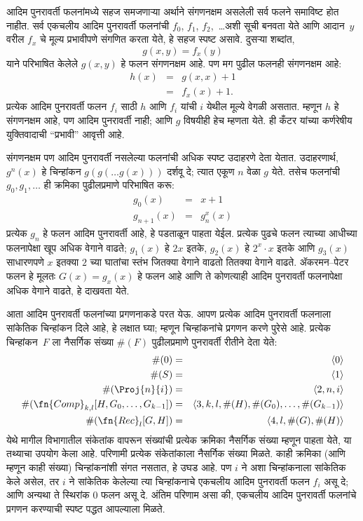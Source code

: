 \documentclass[../../../include/open-logic-section]{subfiles}
\begin{document}

आदिम पुनरावर्ती फलनांमध्ये सहज समजणाऱ्या अर्थाने संगणनक्षम असलेली सर्व
फलने समाविष्ट होत नाहीत. सर्व एकचलीय आदिम पुनरावर्ती फलनांची $f_0$,
$f_1$, $f_2$,~\dots अशी सूची बनवता येते आणि आदान~$y$ वरील $f_x$ चे मूल्य
प्रभावीपणे संगणित करता येते, हे सहज स्पष्ट असावे. दुसऱ्या शब्दांत,
\[
g(x,y) = f_x(y)
\]
याने परिभाषित केलेले $g(x,y)$ हे फलन संगणनक्षम आहे. पण मग पुढील फलनही
संगणनक्षम आहे:
\begin{eqnarray*}
h(x) & = & g(x,x) + 1 \\
& = & f_x(x) +1.
\end{eqnarray*}
प्रत्येक आदिम पुनरावर्ती फलन $f_i$ साठी $h$ आणि $f_i$ यांची $i$ येथील
मूल्ये वेगळी असतात. म्हणून $h$ हे संगणनक्षम आहे, पण आदिम पुनरावर्ती नाही;
आणि $g$ विषयीही हेच म्हणता येते. ही कँटर यांच्या कर्णरेषीय युक्तिवादाची
``प्रभावी'' आवृत्ती आहे.

संगणनक्षम पण आदिम पुनरावर्ती नसलेल्या फलनांची अधिक स्पष्ट उदाहरणे देता
येतात. उदाहरणार्थ, $g^n(x)$ हे चिन्हांकन $g(g(\dots g(x)))$ दर्शवू दे;
त्यात एकूण $n$ वेळा $g$ येते. तसेच फलनांची $g_0,g_1,\dots$ ही क्रमिका
पुढीलप्रमाणे परिभाषित करू:
\begin{eqnarray*}
g_0(x) & = & x+1 \\
g_{n + 1}(x) & = & g_n^x(x)
\end{eqnarray*}
प्रत्येक $g_n$ हे फलन आदिम पुनरावर्ती आहे, हे पडताळून पाहता येईल. प्रत्येक
पुढचे फलन त्याच्या आधीच्या फलनापेक्षा खूप अधिक वेगाने वाढते; $g_1(x)$ हे
$2x$ इतके, $g_2(x)$ हे $2^x \cdot x$ इतके आणि $g_3(x)$ साधारणपणे $x$
इतक्या $2$ च्या घातांचा स्तंभ जितक्या वेगाने वाढतो तितक्या वेगाने वाढते.
ॲकरमन--पेटर फलन हे मूलतः $G(x) = g_x(x)$ हे फलन आहे आणि ते कोणत्याही
आदिम पुनरावर्ती फलनापेक्षा अधिक वेगाने वाढते, हे दाखवता येते.

आता आदिम पुनरावर्ती फलनांच्या प्रगणनाकडे परत येऊ. आपण प्रत्येक आदिम
पुनरावर्ती फलनाला सांकेतिक चिन्हांकन दिले आहे, हे लक्षात घ्या; म्हणून
चिन्हांकनांचे प्रगणन करणे पुरेसे आहे. प्रत्येक चिन्हांकन~$F$ ला नैसर्गिक
संख्या $\#(F)$ पुढीलप्रमाणे पुनरावर्ती रीतीने देता येते:
\begin{eqnarray*}
\#(0) & = & \langle 0 \rangle \\
\#(S) & = & \langle 1 \rangle \\
\#(\Proj{n}{i}) & = & \langle 2, n, i \rangle \\
\#(\fn{Comp}_{k,l}[H,G_0,\dots,G_{k-1}]) & = & \langle
3,k,l,\#(H),\#(G_0),\dots,\#(G_{k-1}) \rangle \\
\#(\fn{Rec}_l[G,H]) & = & \langle 4, l, \#(G), \#(H) \rangle
\end{eqnarray*}
येथे मागील विभागातील संकेतांक वापरून संख्यांची प्रत्येक क्रमिका नैसर्गिक
संख्या म्हणून पाहता येते, या तथ्याचा उपयोग केला आहे. परिणामी प्रत्येक
संकेतांकाला नैसर्गिक संख्या मिळते. काही क्रमिका (आणि म्हणून काही संख्या)
चिन्हांकनांशी संगत नसतात, हे उघड आहे. पण $i$ ने अशा चिन्हांकनाला सांकेतिक
केले असेल, तर $i$ ने सांकेतिक केलेल्या त्या चिन्हांकनाचे एकचलीय आदिम
पुनरावर्ती फलन $f_i$ असू दे; आणि
अन्यथा ते स्थिरांक $0$ फलन असू दे. अंतिम परिणाम असा की, एकचलीय आदिम
पुनरावर्ती फलनांचे प्रगणन करण्याची स्पष्ट पद्धत आपल्याला मिळते.
\end{document}
